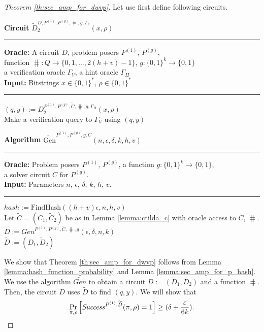 %
\begin{proof}[Theorem \ref{th:sec_amp_for_dwvp}]
Let use first define following circuits.
%
\begin{codeblock}
  \textbf{Circuit} $\widetilde{D}_2^{D, P^{(1)}, P^{(g)}, \hash, g, \Gamma_v}(x, \rho)$
  \medskip
  \hrule
  \medskip
  \textbf{Oracle:} A circuit $D$, problem posers $P^{(1)}$, $P^{(g)}$, \\
  \IndII function $\hash: Q \rightarrow \{0,1, \dots, 2(h+v) - 1\}$, $g: \{0,1\}^{k} \rightarrow \{0,1\}$ \\
  \IndII a verification oracle $\Gamma_V$, a hint oracle $\Gamma_H$\\
  \textbf{Input:}  Bitstrings $x \in \{0,1\}^{*}$, $\rho \in \{0,1\}^{*}$
  \medskip\hrule\medskip
  $(q, y) := D_2^{P^{(1)}, P^{(g)}, \widetilde{C}, \hash, g, \Gamma_H}(x, \rho)$ \\
  Make a verification query to $\Gamma_V$ using $(q,y)$
\end{codeblock}
%
\begin{codeblock}
  \textbf{Algorithm} $\widetilde{\text{Gen}}^{P^{(1)}, P^{(g)}, g, C}(n, \epsilon, \delta, k, h, v)$
  \medskip \hrule \medskip
  \textbf{Oracle:} Problem posers $P^{(1)}$, $P^{(g)}$, a function $g: \{0,1\}^{k} \rightarrow \{0,1\}$, \\
  \IndII a solver circuit $C$ for $P^{(g)}$.  \\
  \textbf{Input:} Parameters $n$, $\epsilon$, $\delta$, $k$, $h$, $v$.
  \medskip\hrule\medskip
  $hash := \text{FindHash}((h+v)\epsilon, n, h, v)$ \\
  Let $\widetilde{C} = (C_1, \widetilde{C}_2)$ be as in Lemma \ref{lemma:ctilda_c} with oracle access to $C$, $\hash$. \\
  $D := Gen^{P^{(1)}, P^{(g)}, \widetilde{C}, \hash, g}(\epsilon, \delta, n, k)$ \\
  \Return $\widetilde{D} := (D_1, \widetilde{D}_2)$
\end{codeblock}
%
We show that Theorem \ref{th:sec_amp_for_dwvp} follows from Lemma \ref{lemma:hash_function_probability} and Lemma \ref{lemma:sec_amp_for_p_hash}.
We use the algorithm $\widetilde{Gen}$ to obtain a circuit $D := (D_1, D_2)$ and a function $\hash$. Then, the circuit $D$ uses $\widetilde{D}$ to find $(q,y)$.
We will show that
\begin{align*}
    \underset{\pi, \rho}{\Pr}\left[\operatorname{\mathit{Success}}^{P^{(1)},\widetilde{D}}(\pi, \rho) = 1\right] \geq (\delta + \frac{\varepsilon}{6k}).
\end{align*}

\end{proof}
